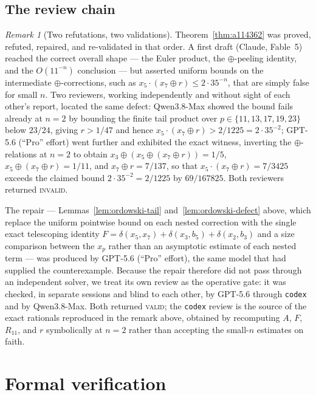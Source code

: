 \documentclass[11pt]{article}
\theoremstyle{plain}
\theoremstyle{definition}
\theoremstyle{remark}
\newtheorem*{remark}{Remark}
\numberwithin{equation}{section}
\begin{document}
\subsection{The review chain}
\label{sec:a114362-review}

\begin{remark}[Two refutations, two validations]
Theorem~\ref{thm:a114362} was proved, refuted, repaired, and re-validated in that order. A first
draft (Claude, Fable~5) reached the correct overall shape --- the Euler product, the
$\oplus$-peeling identity, and the $O(11^{-n})$ conclusion --- but asserted uniform bounds on the
intermediate $\oplus$-corrections, such as $x_5\cdot(x_7\oplus r) \le 2\cdot35^{-n}$, that are
simply false for small $n$. Two reviewers, working independently and without sight of each
other's report, located the same defect: Qwen3.8-Max showed the bound fails already at $n=2$ by
bounding the finite tail product over $p\in\{11,13,17,19,23\}$ below $23/24$, giving
$r > 1/47$ and hence $x_5\cdot(x_7\oplus r) > 2/1225 = 2\cdot35^{-2}$; GPT-5.6 (``Pro'' effort)
went further and exhibited the exact witness, inverting the $\oplus$-relations at $n=2$ to obtain
$x_3\oplus(x_5\oplus(x_7\oplus r)) = 1/5$, $x_5\oplus(x_7\oplus r) = 1/11$, and
$x_7\oplus r = 7/137$, so that $x_5\cdot(x_7\oplus r) = 7/3425$ exceeds the claimed bound
$2\cdot35^{-2}=2/1225$ by $69/167825$. Both reviewers returned \textsc{invalid}.

The repair --- Lemmas~\ref{lem:ordowski-tail} and~\ref{lem:ordowski-defect} above, which replace
the uniform pointwise bound on each nested correction with the single exact telescoping identity
$F = \delta(x_5,x_7)+\delta(x_3,b_5)+\delta(x_2,b_3)$ and a size comparison between the $x_p$
rather than an asymptotic estimate of each nested term --- was produced by GPT-5.6 (``Pro''
effort), the same model that had supplied the counterexample. Because the repair therefore did
not pass through an independent solver, we treat its own review as the operative gate: it was
checked, in separate sessions and blind to each other, by GPT-5.6 through \texttt{codex} and by
Qwen3.8-Max. Both returned \textsc{valid}; the \texttt{codex} review is the source of the exact
rationals reproduced in the remark above, obtained by recomputing $A$, $F$, $R_{11}$, and $r$
symbolically at $n=2$ rather than accepting the small-$n$ estimates on faith.
\end{remark}

\section{Formal verification}
\label{sec:formal}
\end{document}
